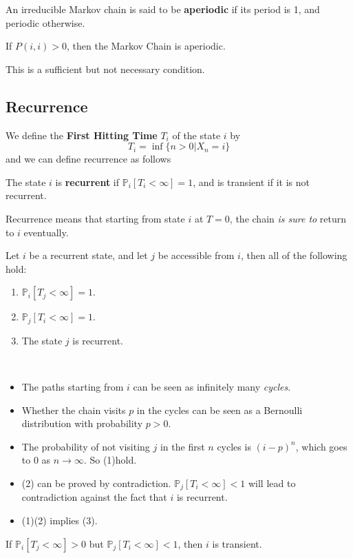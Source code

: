 \begin{definition}[Aperiodicity]
    An irreducible Markov chain is said to be \textbf{aperiodic} if its period is 1, and periodic otherwise.
\end{definition}

\begin{proposition}
    \normalfont
    If $P(i,i) > 0$, then the Markov Chain is aperiodic.
\end{proposition}
\begin{remark}
    This is a sufficient but not necessary condition.
\end{remark}


\subsection{Recurrence}
We define the \textbf{First Hitting Time} $T_i$ of the state $i$ by
\[ T_i = \inf\{n>0 | X_n = i\} \]
and we can define recurrence as follows
\begin{definition}[Recurrence]
    The state $i$ is \textbf{recurrent} if $\mathbb{P}_i[T_i<\infty] = 1$, and is transient if it is not recurrent.
\end{definition}
\begin{remark}
    Recurrence means that starting from state $i$ at $T=0$, the chain \emph{is sure to} return to $i$ eventually.
\end{remark}

\begin{theorem}
    \normalfont
    Let $i$ be a recurrent state, and let $j$ be accessible from $i$, then all of the following hold:
    \begin{enumerate}
        \item $\mathbb{P}_i[T_j < \infty] = 1$.
        \item $\mathbb{P}_j[T_i < \infty] = 1$.
        \item The state $j$ is recurrent.
    \end{enumerate}
\end{theorem}
\begin{sketchproof}
    ~{}
    \begin{itemize}
        \item The paths starting from $i$ can be seen as infinitely many \emph{cycles}.
        \item Whether the chain visits $p$ in the cycles can be seen as a Bernoulli distribution with probability $p>0$.
        \item The probability of not visiting $j$ in the first $n$ cycles is $(i-p)^n$, which goes to $0$ as $n\to\infty$. So (1)hold.
        \item (2) can be proved by contradiction. $\mathbb{P}_j[T_i < \infty] < 1$ will lead to contradiction against the fact that $i$ is recurrent.
        \item (1)(2) implies (3).
    \end{itemize}
\end{sketchproof}
\begin{corollary}
    If $\mathbb{P}_i[T_j < \infty] > 0$ but $\mathbb{P}_j[T_i < \infty] < 1$, then $i$ is transient.
\end{corollary}

